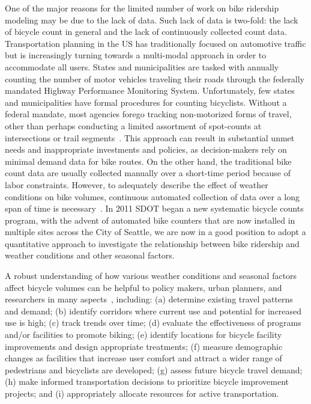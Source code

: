 \documentclass [11pt, proquest] {uwthesis}[2015/03/03]
\begin{document}
One of the major reasons for the limited number of work on bike ridership modeling may be due to the lack of data. Such lack of data is two-fold: the lack of bicycle count in general and the lack of continuously collected count data. Transportation planning in the US has traditionally focused on automotive traffic but is increasingly turning towards a multi-modal approach in order to accommodate all users. States and municipalities are tasked with annually counting the number of motor vehicles traveling their roads through the federally mandated Highway Performance Monitoring System. Unfortunately, few states and municipalities have formal procedures for counting bicyclists. Without a federal mandate, most agencies forego tracking non-motorized forms of travel, other than perhaps conducting a limited assortment of spot-counts at intersections or trail segments~\cite{Kockelman16}. This approach can result in substantial unmet needs and inappropriate investments and policies, as decision-makers rely on minimal demand data for bike routes. On the other hand, the traditional bike count data are usually collected manually over a short-time period because of labor constraints. However, to adequately describe the effect of weather conditions on bike volumes, continuous automated collection of data over a long span of time is necessary~\cite{Miranda-Moreno:2011aa}. In 2011 SDOT began a new systematic bicycle counts program, with the advent of automated bike counters that are now installed in multiple sites across the City of Seattle, we are now in a good position to adopt a quantitative approach to investigate the relationship between bike ridership and weather conditions and other seasonal factors.

A robust understanding of how various weather conditions and seasonal factors affect bicycle volumes can be helpful to policy makers, urban planners, and researchers in many aspects~\cite{LAManual}, including: (a) determine existing travel patterns and demand; (b) identify corridors where current use and potential for increased use is high; (c) track trends over time; (d) evaluate the effectiveness of programs and/or facilities to promote biking; (e) identify locations for bicycle facility improvements and design appropriate treatments; (f) measure demographic changes as facilities that increase user comfort and attract a wider range of pedestrians and bicyclists are developed; (g) assess future bicycle travel demand; (h) make informed transportation decisions to prioritize bicycle improvement projects; and (i) appropriately allocate resources for active transportation.
\end{document}
